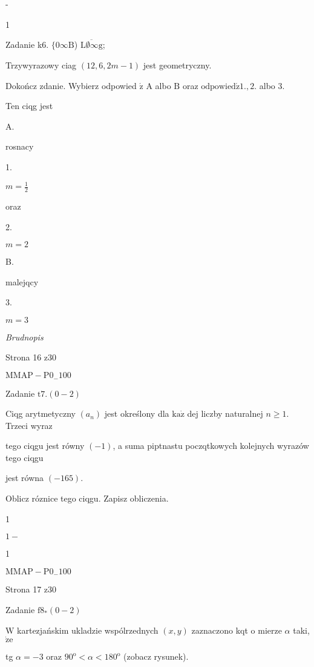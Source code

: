 \documentclass[a4paper,12pt]{article}
\begin{document}
-

1

Zadanie k6. $\{0\infty \mathrm{B}$) $\overline{\mathrm{L}\emptyset\infty \mathrm{g}}$;

Trzywyrazowy ciag $(12,6,2m-1)$ jest geometryczny.

Dokończ zdanie. Wybierz odpowied $\acute{\mathrm{z}}$ A albo $\mathrm{B}$ oraz $\mathrm{o}\mathrm{d}\mathrm{p}\mathrm{o}\mathrm{w}\mathrm{i}\mathrm{e}\mathrm{d}\acute{\mathrm{z}}1., 2$. albo 3.

Ten ciqg jest

A.

rosnacy

1.

$m=\displaystyle \frac{1}{2}$

oraz

2.

$m=2$

B.

malejqcy

3.

$m=3$

{\it Brudnopis}

Strona 16 z30

$\mathrm{M}\mathrm{M}\mathrm{A}\mathrm{P}-\mathrm{P}0_{-}100$





Zadanie $\mathrm{t}7. (0-2)$

Ciqg arytmetyczny $(a_{n})$ jest określony dla $\mathrm{k}\mathrm{a}\dot{\mathrm{z}}$ dej liczby naturalnej $n\geq 1$. Trzeci wyraz

tego ciqgu jest równy $(-1)$, a suma piptnastu poczqtkowych kolejnych wyrazów tego ciqgu

jest równa $(-165).$

Oblicz róznice tego ciqgu. Zapisz obliczenia.

1

$1-$

1

$\mathrm{M}\mathrm{M}\mathrm{A}\mathrm{P}-\mathrm{P}0_{-}100$

Strona 17 z30





Zadanie $\mathrm{f}8_{*}(0-2)$

$\mathrm{W}$ kartezjańskim ukladzie wspólrzednych $(x,y)$ zaznaczono kqt o mierze $\alpha$ taki, $\dot{\mathrm{z}}\mathrm{e}$

tg $\alpha=-3$ oraz $90^{\mathrm{o}}<\alpha<180^{\mathrm{o}}$ (zobacz rysunek).
\end{document}
